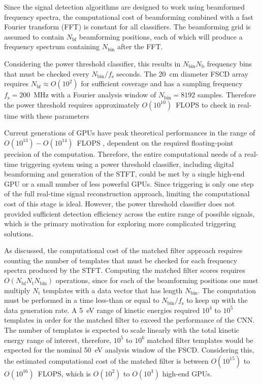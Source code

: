 Since the signal detection algorithms are designed to work using beamformed frequency spectra, the computational cost of beamforming combined with a fast Fourier transform (FFT) is constant for all classifiers. The beamforming grid is assumed to contain $N_\mathrm{bf}$ beamforming positions, each of which will produce a frequency spectrum containing $N_\mathrm{bin}$ after the FFT. 

Considering the power threshold classifier, this results in $N_\mathrm{bin}N_\mathrm{b}$ frequency bins that must be checked every $N_\mathrm{bin}/f_\mathrm{s}$ seconds. The 20~cm diameter FSCD array requires $N_\mathrm{bf}\approx O(10^2)$ for sufficient coverage and has a sampling frequency $f_\mathrm{s}=200$~MHz with a Fourier analysis window of $N_\mathrm{bin}=8192$ samples. Therefore the power threshold requires approximately $O(10^{10})$~FLOPS to check in real-time with these parameters

Current generations of GPUs have peak theoretical performances in the range of $O(10^{13})-O(10^{14})$~FLOPS \cite{h100}, dependent on the required floating-point precision of the computation. Therefore, the entire computational needs of a real-time triggering system using a power threshold classifier, including digital beamforming and generation of the STFT, could be met by a single high-end GPU or a small number of less powerful GPUs. Since triggering is only one step of the full real-time signal reconstruction approach, limiting the computational cost of this stage is ideal. However, the power threshold classifier does not provided sufficient detection efficiency across the entire range of possible signals, which is the primary motivation for exploring more complicated triggering solutions. 

As discussed, the computational cost of the matched filter approach requires counting the number of templates that must be checked for each frequency spectra produced by the STFT. Computing the matched filter scores requires $O(N_\mathrm{bf}N_\mathrm{t}N_\mathrm{bin})$ operations, since for each of the beamforming positions one must multiply $N_\mathrm{t}$ templates with a data vector that has length $N_\mathrm{bin}$. The computation must be performed in a time less-than or equal to $N_\mathrm{bin}/f_\mathrm{s}$ to keep up with the data generation rate. A 5~eV range of kinetic energies required $10^4$ to $10^5$ templates in order for the matched filter to exceed the performance of the CNN. The number of templates is expected to scale linearly with the total kinetic energy range of interest, therefore, $10^5$ to $10^6$ matched filter templates would be expected for the nominal 50~eV analysis window of the FSCD. Considering this, the estimated computational cost of the matched filter is between $O(10^{15})$ to $O(10^{16})$~FLOPS, which is $O(10^2)$ to $O(10^3)$ high-end GPUs.

